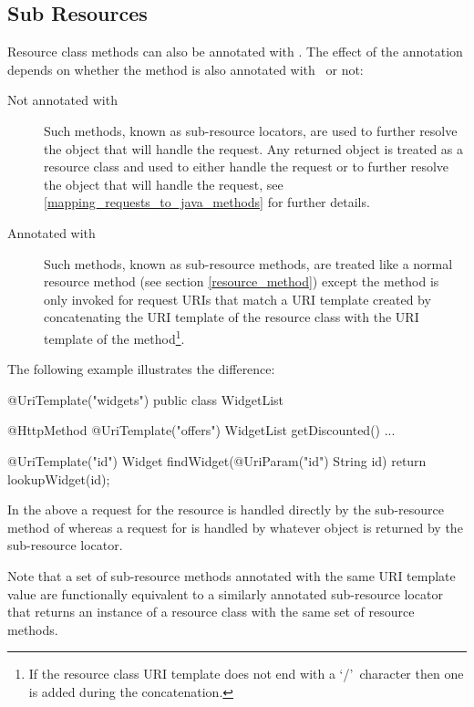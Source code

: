 \subsection{Sub Resources}
\label{sub_resources}

Resource class methods can also be annotated with \UriTemplate. The effect of the annotation depends on whether the method is also annotated with \HttpMethod\ or not:

\begin{description}
\item[Not annotated with \HttpMethod] Such methods, known as sub-resource locators, are used to further resolve the object that will handle the request. Any returned object is treated as a resource class and used to either handle the request or to further resolve the object that will handle the request, see \ref{mapping_requests_to_java_methods} for further details.
\item[Annotated with \HttpMethod] Such methods, known as sub-resource methods, are treated like a normal resource method (see section \ref{resource_method}) except the method is only invoked for request URIs that match a URI template created by concatenating the URI template of the resource class with the URI template of the method\footnote{If the resource class URI template does not end with a \lq/\rq\ character then one is added during the concatenation.}.
\end{description}

The following example illustrates the difference:

\begin{listing}{1}
@UriTemplate("widgets")
public class WidgetList {
  @HttpMethod
  @UriTemplate("offers")
  WidgetList getDiscounted() {...}
  
  @UriTemplate("{id}")
  Widget findWidget(@UriParam("id") String id) {
    return lookupWidget(id);
  }
}\end{listing}

In the above a  request for the  resource is handled directly by the  sub-resource method of  whereas a  request for  is handled by whatever object is returned by the  sub-resource locator.

Note that a set of sub-resource methods annotated with the same URI template value are functionally equivalent to a similarly annotated sub-resource locator that returns an instance of a resource class with the same set of resource methods.

